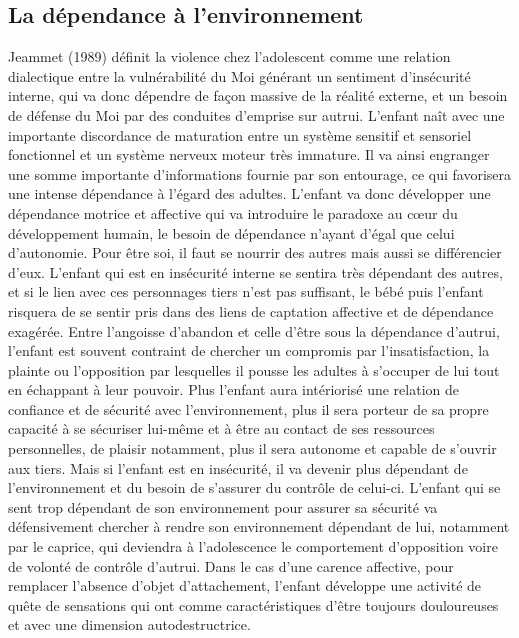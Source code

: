\documentclass[12pt, a4paper]{book}
\begin{document}
\begin{spacing}{1.5}
\subsection{La dépendance à l'environnement}

Jeammet (1989) définit la violence chez l'adolescent comme une relation dialectique entre la vulnérabilité du Moi générant un sentiment d'insécurité interne, qui va donc dépendre de façon massive de  la réalité externe, et un besoin de défense du Moi par des conduites d'emprise sur autrui. L'enfant naît avec une importante discordance de maturation entre un système sensitif et sensoriel fonctionnel et un système nerveux moteur très immature. Il va ainsi engranger une somme importante d'informations fournie  par son entourage, ce qui favorisera une intense dépendance à l'égard des adultes. L'enfant va donc développer une dépendance motrice et affective qui va introduire le paradoxe au cœur du développement humain, le besoin de dépendance n'ayant d'égal que celui d'autonomie.  Pour être soi, il faut se nourrir des autres mais aussi se différencier d'eux. L'enfant qui est en insécurité interne se sentira très dépendant des autres, et si le lien avec ces personnages tiers n'est pas suffisant, le bébé puis l'enfant risquera de se sentir pris dans des liens de captation affective et de dépendance exagérée. Entre l'angoisse d'abandon et celle d'être sous la dépendance d'autrui, l'enfant est souvent contraint de chercher un compromis par l'insatisfaction, la plainte ou l'opposition par lesquelles il pousse les adultes à s'occuper de lui tout en échappant à leur pouvoir. Plus l'enfant aura intériorisé une relation de confiance et de sécurité avec l'environnement, plus il sera porteur de sa propre capacité à se sécuriser lui-même et à être au contact de ses ressources personnelles, de plaisir notamment, plus il sera autonome et capable de s'ouvrir aux tiers. Mais si l'enfant est en insécurité, il va devenir plus dépendant de l'environnement et du besoin de s'assurer du contrôle de celui-ci. L'enfant qui se sent trop dépendant de son environnement pour assurer sa sécurité va défensivement chercher à rendre son environnement dépendant de lui, notamment par le caprice, qui deviendra à l'adolescence le comportement d'opposition voire de volonté de contrôle d'autrui. Dans le cas d'une carence affective, pour remplacer l'absence d'objet d'attachement, l'enfant développe une activité de quête de sensations qui ont comme caractéristiques d'être toujours douloureuses et avec une dimension autodestructrice.


\end{spacing}
\end{document}
